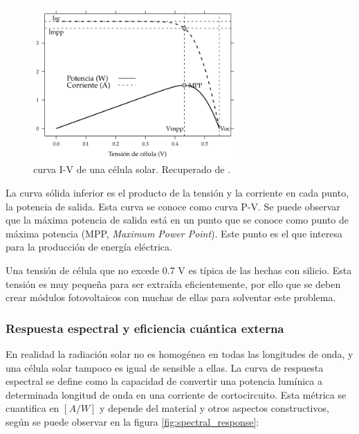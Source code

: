 \begin{figure}[H]
      \centering
      \includegraphics[width=0.7\textwidth]{./images/SoA_irrad/Solar_Cell_I-V_Curve_Schematic.png}
      \caption{\Gls{curva I-V} de una \gls{célula solar}. Recuperado de \cite[Fig. 4.6]{Perpinan2020}.}
      \label{fig:iv_curve}
\end{figure}

La curva sólida inferior es el producto de la tensión y la corriente en cada punto, la potencia de salida. Esta curva se conoce como \gls{curva P-V}. Se puede observar que la máxima potencia de salida está en un punto que se conoce como punto de máxima potencia (MPP, \textit{Maximum Power Point}). Este punto es el que interesa para la producción de energía eléctrica.

Una tensión de célula que no excede 0.7 V es típica de las hechas con silicio. Esta tensión es muy pequeña para ser extraída eficientemente, por ello que se deben crear módulos fotovoltaicos con muchas de ellas para solventar este problema.

\subsubsection{Respuesta espectral y eficiencia cuántica externa}

En realidad la \gls{radiación solar} no es homogénea en todas las longitudes de onda, y una \gls{célula solar} tampoco es igual de sensible a ellas. La curva de \gls{respuesta espectral} se define como la capacidad de convertir una potencia lumínica a determinada \gls{longitud de onda} en una corriente de cortocircuito. Esta métrica se cuantifica en $[A/W]$ y depende del material y otros aspectos constructivos, según se puede observar en la figura \ref{fig:spectral_response}:

